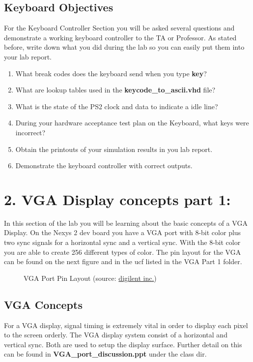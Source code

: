 \documentclass{article}
\begin{document}
\subsection{Keyboard Objectives}
For the Keyboard Controller Section you will be asked several questions and demonstrate a working keyboard controller to the TA or Professor. As stated before, write down what you did during the lab so you can easily put them into your lab report.

\begin{enumerate}
  \item What break codes does the keyboard send when you type \textbf{key}?
  \item What are lookup tables used in the \textbf{keycode\_to\_ascii.vhd} file?
  \item What is the state of the PS2 clock and data to indicate a idle line?
  \item During your hardware acceptance test plan on the Keyboard, what keys were incorrect?
  \item Obtain the printouts of your simulation results in you lab report.
  \item Demonstrate the keyboard controller with correct outputs.
\end{enumerate}

\newpage

\section{2. VGA Display concepts part 1:}
In this section of the lab you will be learning about the basic concepts of a VGA Display. On the Nexys 2 dev board you have a VGA port with 8-bit color plus two sync signals for a horizontal sync and a vertical sync. With the 8-bit color you are able to create 256 different types of color. The pin layout for the VGA can be found on the next figure and in the ucf listed in the VGA Part 1 folder.

\begin{figure}[!htbp]
  \centering
  \caption{VGA Port Pin Layout (source: \href{http://www.digilentinc.com/}{digilent inc.})}
\end{figure}

\subsection{VGA Concepts}
For a VGA display, signal timing is extremely vital in order to display each pixel to the screen orderly. The VGA display system consist of a horizontal and vertical sync. Both are used to setup the display surface. Further detail on this can be found in \textbf{VGA\_port\_discussion.ppt} under the class dir.
\end{document}
